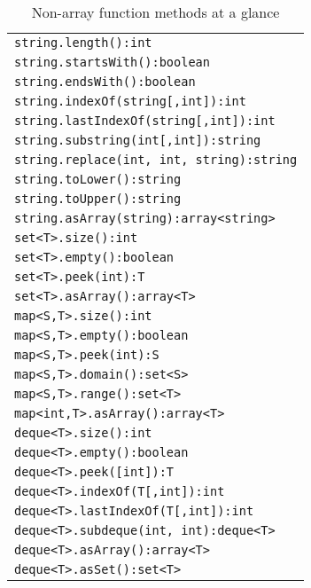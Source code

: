 \begin{table}[htbp]
\centering
\begin{tabular}{|l|}
\hline
\texttt{string.length():int}\\
\texttt{string.startsWith():boolean}\\
\texttt{string.endsWith():boolean}\\
\texttt{string.indexOf(string[,int]):int}\\
\texttt{string.lastIndexOf(string[,int]):int}\\
\texttt{string.substring(int[,int]):string}\\
\texttt{string.replace(int, int, string):string}\\
\texttt{string.toLower():string}\\
\texttt{string.toUpper():string}\\
\texttt{string.asArray(string):array<string>}\\
\hline
\texttt{set<T>.size():int}\\
\texttt{set<T>.empty():boolean}\\
\texttt{set<T>.peek(int):T}\\
\texttt{set<T>.asArray():array<T>}\\
\hline
\texttt{map<S,T>.size():int}\\
\texttt{map<S,T>.empty():boolean}\\
\texttt{map<S,T>.peek(int):S}\\
\texttt{map<S,T>.domain():set<S>}\\
\texttt{map<S,T>.range():set<T>}\\
\texttt{map<int,T>.asArray():array<T>}\\
\hline
\texttt{deque<T>.size():int}\\
\texttt{deque<T>.empty():boolean}\\
\texttt{deque<T>.peek([int]):T}\\
\texttt{deque<T>.indexOf(T[,int]):int}\\
\texttt{deque<T>.lastIndexOf(T[,int]):int}\\
\texttt{deque<T>.subdeque(int, int):deque<T>}\\
\texttt{deque<T>.asArray():array<T>}\\
\texttt{deque<T>.asSet():set<T>}\\
\hline
\end{tabular}
\caption{Non-array function methods at a glance}
\label{funcmethstab}
\end{table}

